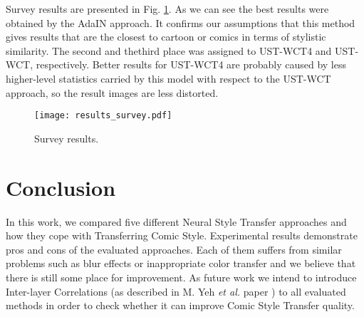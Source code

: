 \documentclass{llncs}
\begin{document}
Survey results are presented in Fig. \ref{survey:results}. As we can see the best results were obtained by the AdaIN approach. It confirms our assumptions that this method gives results that are the closest to cartoon or comics in terms of stylistic similarity. The second and thethird place was assigned to UST-WCT4 and UST-WCT, respectively. Better results for UST-WCT4 are probably caused by less higher-level statistics carried by this model with respect to the UST-WCT approach, so the result images are less distorted.

\begin{figure}[H]
  \centering
  \texttt{[image: results\_survey.pdf]}
  \caption{Survey results.\label{survey:results}}
\end{figure}

%
\section{Conclusion}
%

In this work, we compared five different Neural Style Transfer approaches and how they cope with Transferring Comic Style. Experimental results demonstrate pros and cons of the evaluated approaches. Each of them suffers from similar problems such as blur effects or inappropriate color transfer and we believe that there is still some place for improvement. As future work we intend to introduce Inter-layer Correlations (as described in M. Yeh \textit{et al.} paper \cite{inter:layer}) to all evaluated methods in order to check whether it can improve Comic Style Transfer quality. %
\end{document}

